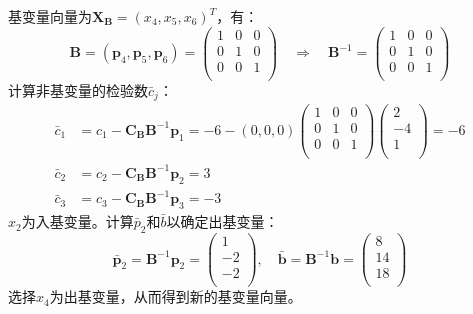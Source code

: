 \begin{mdframed}
 {\hei 基变量向量为}$\mathbf{X_B}=( x_4,x_5,x_6 )^T$，有：
\[\mathbf{B}=( \mathbf{p}_4,\mathbf{p}_5,\mathbf{p}_6 )=\begin{pmatrix}
   1 & 0 & 0  \\
   0 & 1 & 0  \\
   0 & 0 & 1  \\
\end{pmatrix}\quad \Rightarrow \quad \mathbf{B}^{-1}=\begin{pmatrix}
   1 & 0 & 0  \\
   0 & 1 & 0  \\
   0 & 0 & 1  \\
\end{pmatrix}\]
计算非基变量的检验数$\bar c_j$：
\begin{align*}
\bar c_1&=c_1-\mathbf{C_B}{\mathbf{B}^{-1}}{\mathbf{p}_1}=\mbox{$-$}6-( 0,0,0 )\begin{pmatrix}
   1 & 0 & 0  \\
   0 & 1 & 0  \\
   0 & 0 & 1  \\
\end{pmatrix}\begin{pmatrix}
   2  \\
   \mbox{$-$}4  \\
   1  \\
\end{pmatrix}=\mbox{$-$}6 \\
  \bar c_2&=c_2-\mathbf{C_B}{\mathbf{B}^{-1}}{\mathbf{p}_2}=3\\
\bar c_3&=c_3-\mathbf{C_B}{\mathbf{B}^{-1}}{\mathbf{p}_3}=\mbox{$-$}3
\end{align*}
$x_2$为入基变量。计算${{\bar p}_2}$和$\bar b$以确定出基变量：
\[\mathbf{\bar p}_2=\mathbf{B}^{-1}{\mathbf{p}_2}=\begin{pmatrix}
   1  \\
   \mbox{$-$}2  \\
   \mbox{$-$}2  \\
\end{pmatrix},\quad  \mathbf{\bar b}=\mathbf{B}^{-1}\mathbf{b}=\begin{pmatrix}
   8  \\
   14  \\
   18  \\
\end{pmatrix}\]
选择$x_4$为出基变量，从而得到新的基变量向量。




\end{mdframed}
